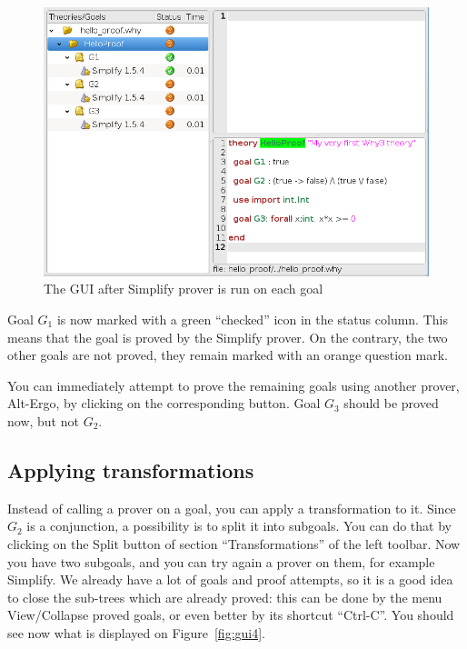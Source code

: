 \begin{figure}[tbp]
\includegraphics[width=\textwidth]{gui-0-70-3.png}
  \caption{The GUI after Simplify prover is run on each goal}
  \label{fig:gui3}
\end{figure}

Goal $G_1$ is now marked with a green ``checked'' icon in the
status column. This means that the goal is proved by the Simplify
prover. On the contrary, the two other goals are not proved, they remain
marked with an orange question mark.

You can immediately attempt to prove the remaining goals using another
prover, \eg Alt-Ergo, by clicking on the corresponding button.
Goal $G_3$ should be proved now, but not $G_2$.

\subsection{Applying transformations}

Instead of calling a prover on a goal, you can apply a transformation
to it.  Since $G_2$ is a conjunction, a possibility is to split it
into subgoals. You can do that by clicking on the \textsf{Split}
button of section ``Transformations'' of the left toolbar. Now you
have two subgoals, and you can try again a prover on them, for example
Simplify. We already have a lot of goals and proof attempts, so it is a good idea to close the sub-trees which are already proved: this can be done by the menu \textsf{View/Collapse proved goals}, or even better by its shortcut ``Ctrl-C''.
You should see now what is displayed on Figure~\ref{fig:gui4}.

